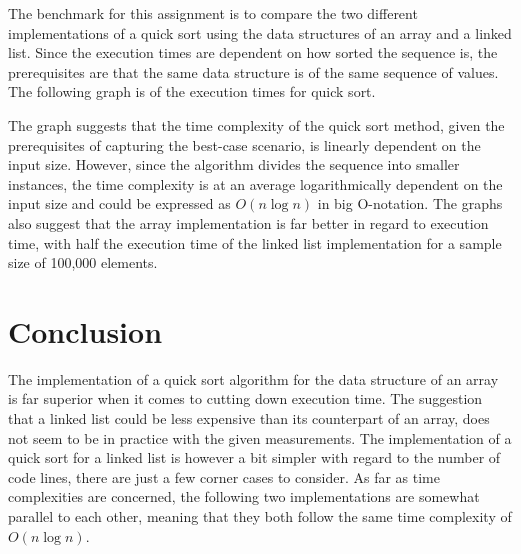 \documentclass[a4paper,11pt]{article}
\begin{document}
    The benchmark for this assignment is to compare the two different implementations of a quick sort using the data structures of an array and a linked list. Since the execution times are dependent on how sorted the sequence is, the prerequisites are that the same data structure is of the same sequence of values. The following graph is of the execution times for quick sort.
    \begin{center}
    \end{center}
    The graph suggests that the time complexity of the quick sort method, given the prerequisites of capturing the best-case scenario, is linearly dependent on the input size. However, since the algorithm divides the sequence into smaller instances, the time complexity is at an average logarithmically dependent on the input size and could be expressed as $O(n \log n)$ in big O-notation. The graphs also suggest that the array implementation is far better in regard to execution time, with half the execution time of the linked list implementation for a sample size of 100,000 elements.
\section*{Conclusion}

    The implementation of a quick sort algorithm for the data structure of an array is far superior when it comes to cutting down execution time. The suggestion that a linked list could be less expensive than its counterpart of an array, does not seem to be in practice with the given measurements. The implementation of a quick sort for a linked list is however a bit simpler with regard to the number of code lines, there are just a few corner cases to consider. As far as time complexities are concerned, the following two implementations are somewhat parallel to each other, meaning that they both follow the same time complexity of $O(n \log n)$. 
        
    
\end{document}
